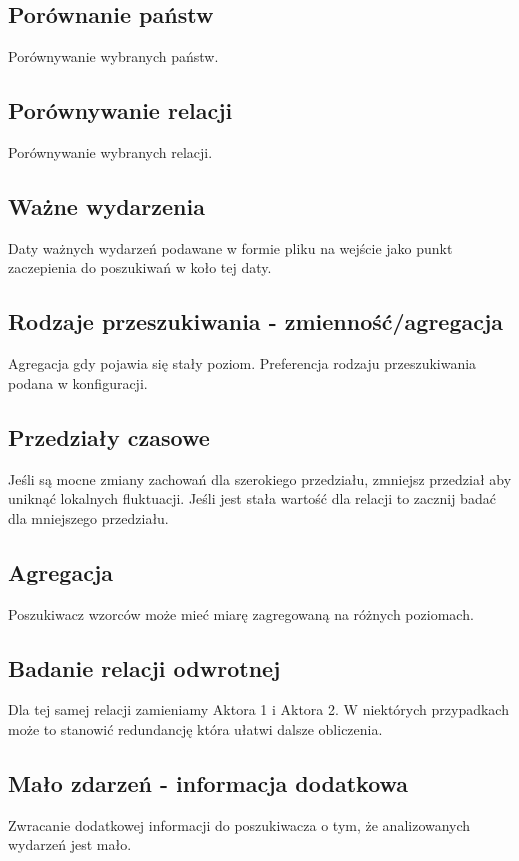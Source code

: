 \documentclass[11pt]{report}
\begin{document}
    \subsection{Porównanie państw}
    Porównywanie wybranych państw.

    \subsection{Porównywanie relacji}
    Porównywanie wybranych relacji.

    \subsection{Ważne wydarzenia}
    Daty ważnych wydarzeń podawane w formie pliku na wejście jako punkt zaczepienia do poszukiwań w koło tej daty.

    \subsection{Rodzaje przeszukiwania - zmienność/agregacja}
    Agregacja gdy pojawia się stały poziom.
    Preferencja rodzaju przeszukiwania podana w konfiguracji.

    \subsection{Przedziały czasowe}\label{subsec:przedziały-czasowe}
    Jeśli są mocne zmiany zachowań dla szerokiego przedziału, zmniejsz przedział aby uniknąć lokalnych fluktuacji.
    Jeśli jest stała wartość dla relacji to zacznij badać dla mniejszego przedziału.

    \subsection{Agregacja}
    Poszukiwacz wzorców może mieć miarę zagregowaną na różnych poziomach.

    \subsection{Badanie relacji odwrotnej}
    Dla tej samej relacji zamieniamy Aktora 1 i Aktora 2.
    W niektórych przypadkach może to stanowić redundancję która ułatwi dalsze obliczenia.

    \subsection{Mało zdarzeń - informacja dodatkowa}
    Zwracanie dodatkowej informacji do poszukiwacza o tym, że analizowanych wydarzeń jest mało.
\end{document}

